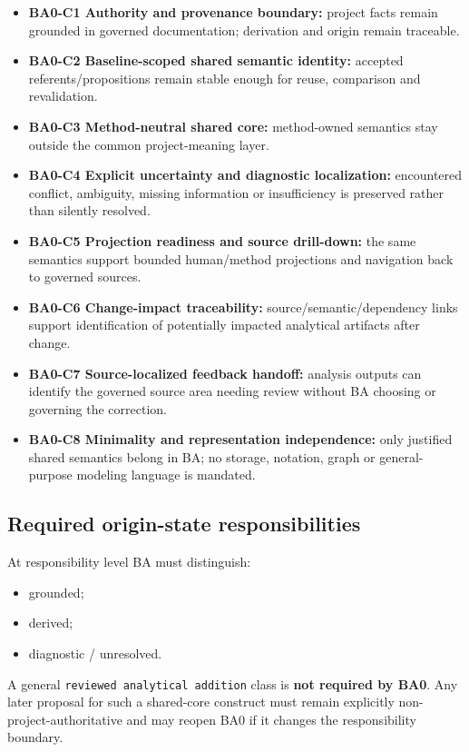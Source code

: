 \documentclass[
  10pt,
]{article}
\providecommand{\tightlist}{%
  \setlength{\itemsep}{0pt}\setlength{\parskip}{0pt}}
\begin{document}
\begin{itemize}
\tightlist
\item
  \textbf{BA0-C1 Authority and provenance boundary:} project facts
  remain grounded in governed documentation; derivation and origin
  remain traceable.
\item
  \textbf{BA0-C2 Baseline-scoped shared semantic identity:} accepted
  referents/propositions remain stable enough for reuse, comparison and
  revalidation.
\item
  \textbf{BA0-C3 Method-neutral shared core:} method-owned semantics
  stay outside the common project-meaning layer.
\item
  \textbf{BA0-C4 Explicit uncertainty and diagnostic localization:}
  encountered conflict, ambiguity, missing information or insufficiency
  is preserved rather than silently resolved.
\item
  \textbf{BA0-C5 Projection readiness and source drill-down:} the same
  semantics support bounded human/method projections and navigation back
  to governed sources.
\item
  \textbf{BA0-C6 Change-impact traceability:} source/semantic/dependency
  links support identification of potentially impacted analytical
  artifacts after change.
\item
  \textbf{BA0-C7 Source-localized feedback handoff:} analysis outputs
  can identify the governed source area needing review without BA
  choosing or governing the correction.
\item
  \textbf{BA0-C8 Minimality and representation independence:} only
  justified shared semantics belong in BA; no storage, notation, graph
  or general-purpose modeling language is mandated.
\end{itemize}

\subsection{Required origin-state
responsibilities}\label{required-origin-state-responsibilities}

At responsibility level BA must distinguish:

\begin{itemize}
\tightlist
\item
  grounded;
\item
  derived;
\item
  diagnostic / unresolved.
\end{itemize}

A general \texttt{reviewed\ analytical\ addition} class is \textbf{not
required by BA0}. Any later proposal for such a shared-core construct
must remain explicitly non-project-authoritative and may reopen BA0 if
it changes the responsibility boundary.
\end{document}
